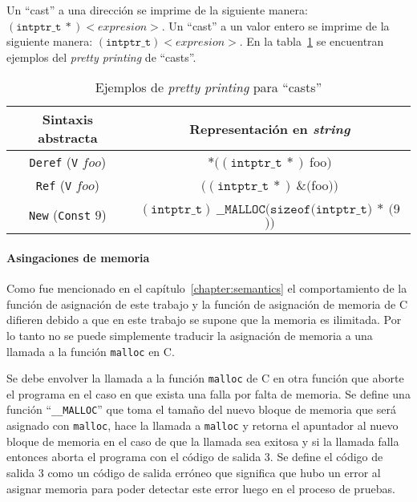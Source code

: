 Un ``cast'' a una dirección se imprime de la siguiente manera: $(\mathtt{intptr\_t}\ *) <expresion>$.
Un ``cast'' a un valor entero se imprime de la siguiente manera: $(\mathtt{intptr\_t}) <expresion>$.
En la tabla~\ref{tab:pretty_casts} se encuentran ejemplos del \textit{pretty printing} de ``casts''.

\begin{table}[h!]
\centering
\begin{tabular}{|c|c|}
  \hline
  \textbf{Sintaxis abstracta} & \textbf{Representación en \textit{string}} \\ [0.5ex]
  \hline \hline
  \verb|Deref| (\verb|V| $foo$) & $*((\mathtt{intptr\_t}\ *)\ $foo$)$ \\
  \verb|Ref| (\verb|V| $foo$)   & $((\mathtt{intptr\_t}\ *)\ \&($foo$))$ \\
  \verb|New| (\verb|Const| $9$) & $(\mathtt{intptr\_t})\ \mathtt{\_\_MALLOC}(\mathtt{sizeof}(\mathtt{intptr\_t)}\ *\ ($9$))$ \\
  \hline
\end{tabular}

\caption{Ejemplos de \textit{pretty printing} para ``casts''}
\label{tab:pretty_casts}
\end{table}


\paragraph*{Asingaciones de memoria}

Como fue mencionado en el capítulo~\ref{chapter:semantics} el comportamiento de la función de asignación de este trabajo y la función de asignación de memoria de C difieren debido a que en este trabajo se supone que la memoria es ilimitada.
Por lo tanto no se puede simplemente traducir la asignación de memoria a una llamada a la función \verb|malloc| en C.

Se debe envolver la llamada a la función \verb|malloc| de C en otra función que aborte el programa en el caso en que exista una falla por falta de memoria.
Se define una función ``\verb|__MALLOC|'' que toma el tamaño del nuevo bloque de memoria que será asignado con \verb|malloc|, hace la llamada a \verb|malloc| y retorna el apuntador al nuevo bloque de memoria en el caso de que la llamada sea exitosa y si la llamada falla entonces aborta el programa con el código de salida 3.
Se define el código de salida 3 como un código de salida erróneo que significa que hubo un error al asignar memoria para poder detectar este error luego en el proceso de pruebas.



